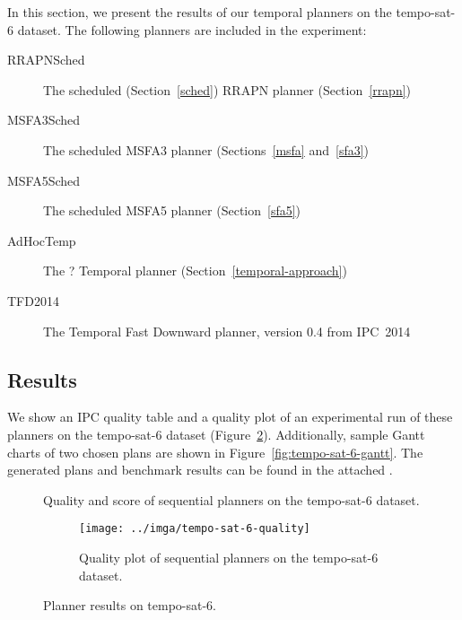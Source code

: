 In this section, we present the results of our temporal planners on the tempo-sat-6 dataset. The following planners are included in the experiment:
\begin{description}
\item[RRAPNSched] The scheduled (Section~\ref{sched}) RRAPN planner (Section~\ref{rrapn})
\item[MSFA3Sched] The scheduled MSFA3 planner (Sections~\ref{msfa} and~\ref{sfa3})
\item[MSFA5Sched] The scheduled MSFA5 planner (Section~\ref{sfa5})
\item[AdHocTemp] The ? Temporal planner (Section~\ref{temporal-approach})
\item[TFD2014] The Temporal Fast Downward planner, version 0.4 from IPC~2014 \citep[Preferring Preferred Operators in Temporal Fast Downward]{Vallati2015}
\end{description}

\subsection{Results}\label{temporal-results}

We show an IPC quality table and a quality plot of an experimental run of these planners on the tempo-sat-6 dataset (Figure~\ref{fig:tempo-sat-6-results}).
Additionally, sample Gantt charts \citep{Gantt1910} of two chosen plans are shown in Figure~\ref{fig:tempo-sat-6-gantt}.
The generated plans and benchmark results can be found in the attached .

\begin{figure}[tbp]
\centering
\begin{subtable}{\textwidth}
\centering
\scriptsize
\renewcommand{\footnotesize}{\scriptsize}

\caption{Quality and score of sequential planners on the tempo-sat-6 dataset.}
\label{tab:tempo-sat-6-ipc-scores}
\end{subtable}

\vspace{0.5cm}
\begin{subfigure}{\textwidth}
\centering
\texttt{[image: ../imga/tempo-sat-6-quality]}
\caption{Quality plot of sequential planners on the tempo-sat-6 dataset.}
\label{fig:tempo-sat-6-quality}
\end{subfigure}
\caption{Planner results on tempo-sat-6.}
\label{fig:tempo-sat-6-results}
\end{figure}

